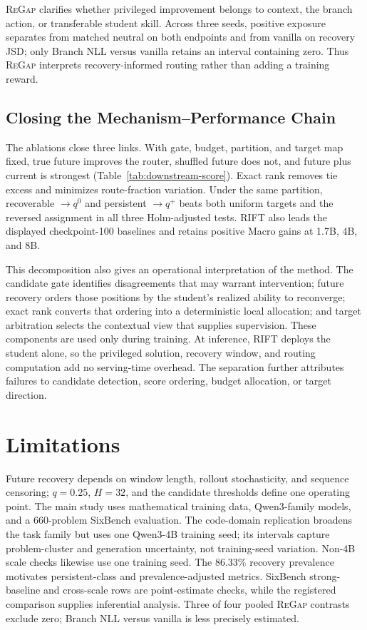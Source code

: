 \documentclass[letterpaper]{article}
\newcommand{\RIFT}{\textsc{RIFT}}
\newcommand{\ReGap}{\textsc{ReGap}}
\begin{document}
\ReGap{} clarifies whether privileged improvement belongs to context, the
branch action, or transferable student skill. Across three seeds, positive
exposure separates from matched neutral on both endpoints and from vanilla on
recovery JSD; only Branch NLL versus vanilla retains an interval containing
zero. Thus \ReGap{} interprets recovery-informed routing rather than adding a
training reward.

\subsection{Closing the Mechanism--Performance Chain}

The ablations close three links. With gate, budget, partition, and target map
fixed, true future improves the router, shuffled future does not, and future
plus current is strongest (Table~\ref{tab:downstream-score}). Exact rank removes
tie excess and minimizes route-fraction variation. Under the same partition,
recoverable $\to q^0$ and persistent $\to q^+$ beats both uniform targets and
the reversed assignment in all three Holm-adjusted tests. \RIFT{} also leads
the displayed checkpoint-100 baselines and retains positive Macro gains at
1.7B, 4B, and 8B.

This decomposition also gives an operational interpretation of the method. The
candidate gate identifies disagreements that may warrant intervention; future
recovery orders those positions by the student's realized ability to
reconverge; exact rank converts that ordering into a deterministic local
allocation; and target arbitration selects the contextual view that supplies
supervision. These components are used only during training. At inference,
\RIFT{} deploys the student alone, so the privileged solution, recovery window,
and routing computation add no serving-time overhead. The separation further
attributes failures to candidate detection, score ordering, budget allocation,
or target direction.

\section{Limitations}

Future recovery depends on window length, rollout stochasticity, and sequence
censoring; $q=0.25$, $H=32$, and the candidate thresholds define one operating
point. The main study uses mathematical training data, Qwen3-family models, and
a 660-problem SixBench evaluation. The code-domain replication broadens the
task family but uses one Qwen3-4B training seed; its intervals capture
problem-cluster and generation uncertainty, not training-seed variation.
Non-4B scale checks likewise use one training seed. The 86.33\% recovery
prevalence motivates persistent-class and prevalence-adjusted metrics.
SixBench strong-baseline and cross-scale rows are point-estimate checks, while
the registered comparison supplies inferential analysis. Three of four pooled
\ReGap{} contrasts exclude zero; Branch NLL versus vanilla is less precisely
estimated.
\end{document}
